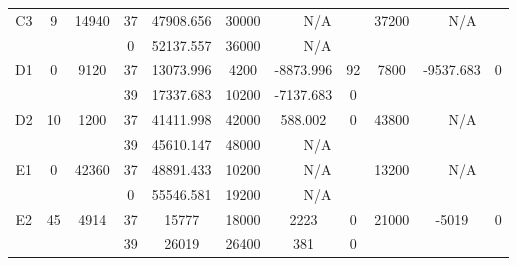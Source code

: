 \begin{sidewaystable}
\begin{tabular}{c||c|c||c|c|c|c|c||c|c|c}
         &
        
      \\
      \hline
      \multirow{2}{*}{C3} &
      \multirow{2}{*}{9} &
      \multirow{2}{*}{14940} &
      37 &
      47908.656 &
      30000 &
        \multicolumn{2}{|c||}{N/A} &
      \multirow{2}{*}{37200} &
        \multicolumn{2}{c}{\multirow{2}{*}{N/A}}
      \\
      \cline{4-8}
       &
       &
       &
      0 &
      52137.557 &
      36000 &
        \multicolumn{2}{|c||}{N/A} &
      
        
      \\
      \hline
      \multirow{2}{*}{D1} &
      \multirow{2}{*}{0} &
      \multirow{2}{*}{9120} &
      37 &
      13073.996 &
      4200 &
        -8873.996 &
        92 &
      \multirow{2}{*}{7800} &
        \multirow{2}{*}{-9537.683} &
        \multirow{2}{*}{0}
      \\
      \cline{4-8}
       &
       &
       &
      39 &
      17337.683 &
      10200 &
        -7137.683 &
        0 &
      
         &
        
      \\
      \hline
      \multirow{2}{*}{D2} &
      \multirow{2}{*}{10} &
      \multirow{2}{*}{1200} &
      37 &
      41411.998 &
      42000 &
        588.002 &
        0 &
      \multirow{2}{*}{43800} &
        \multicolumn{2}{c}{\multirow{2}{*}{N/A}}
      \\
      \cline{4-8}
       &
       &
       &
      39 &
      45610.147 &
      48000 &
        \multicolumn{2}{|c||}{N/A} &
      
        
      \\
      \hline
      \multirow{2}{*}{E1} &
      \multirow{2}{*}{0} &
      \multirow{2}{*}{42360} &
      37 &
      48891.433 &
      10200 &
        \multicolumn{2}{|c||}{N/A} &
      \multirow{2}{*}{13200} &
        \multicolumn{2}{c}{\multirow{2}{*}{N/A}}
      \\
      \cline{4-8}
       &
       &
       &
      0 &
      55546.581 &
      19200 &
        \multicolumn{2}{|c||}{N/A} &
      
        
      \\
      \hline
      \multirow{2}{*}{E2} &
      \multirow{2}{*}{45} &
      \multirow{2}{*}{4914} &
      37 &
      15777 &
      18000 &
        2223 &
        0 &
      \multirow{2}{*}{21000} &
        \multirow{2}{*}{-5019} &
        \multirow{2}{*}{0}
      \\
      \cline{4-8}
       &
       &
       &
      39 &
      26019 &
      26400 &
        381 &
        0 &
      

\end{tabular}
\end{sidewaystable}
